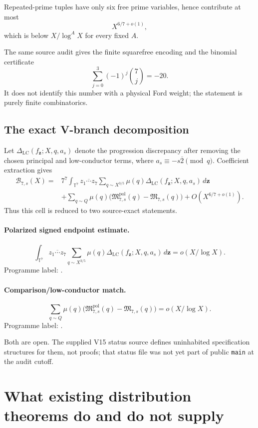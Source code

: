 \documentclass[11pt]{article}
\theoremstyle{definition}
\newcommand{\1}{\mathbf 1}
\newcommand{\B}{\mathcal B}
\begin{document}
Repeated-prime tuples have only six free prime variables, hence contribute at most
\[
X^{6/7+o(1)},
\]
which is below $X/\log^A X$ for every fixed $A$.

The same source audit gives the finite squarefree encoding and the binomial certificate
\[
\sum_{j=0}^{3}(-1)^j\binom7j=-20.
\]
It does not identify this number with a physical Ford weight; the statement is purely
finite combinatorics.

\subsection{The exact V-branch decomposition}

Let $\Delta_{\mathrm{LC}}(f_{\mathbf z};X,q,a_s)$ denote the progression discrepancy after
removing the chosen principal and low-conductor terms, where
$a_s\equiv-s\overline2\pmod q$.  Coefficient extraction gives
\[
\begin{aligned}
\B_{7,s}(X)
={}&7^7\int_{\mathbb T^7}\overline{z_1\cdots z_7}
\sum_{q\sim X^{3/5}}\mu(q)
\Delta_{\mathrm{LC}}(f_{\mathbf z};X,q,a_s)\,d\mathbf z\\
&+\sum_{q\sim Q}\mu(q)
\bigl(\mathfrak M^{\mathrm{pol}}_{7,s}(q)-\mathfrak M_{7,s}(q)\bigr)
+O(X^{6/7+o(1)}).
\end{aligned}
\]
Thus this cell is reduced to two source-exact statements.

\paragraph{Polarized signed endpoint estimate.}
\[
\int_{\mathbb T^7}\overline{z_1\cdots z_7}
\sum_{q\sim X^{3/5}}\mu(q)
\Delta_{\mathrm{LC}}(f_{\mathbf z};X,q,a_s)\,d\mathbf z
=o(X/\log X).
\]
Programme label:
.

\paragraph{Comparison/low-conductor match.}
\[
\sum_{q\sim Q}\mu(q)
\bigl(\mathfrak M^{\mathrm{pol}}_{7,s}(q)-\mathfrak M_{7,s}(q)\bigr)
=o(X/\log X).
\]
Programme label:
.

Both are open.  The supplied V15 status source defines uninhabited specification structures
for them, not proofs; that status file was not yet part of public \texttt{main} at the audit
cutoff.

\section{What existing distribution theorems do and do not supply}
\end{document}
